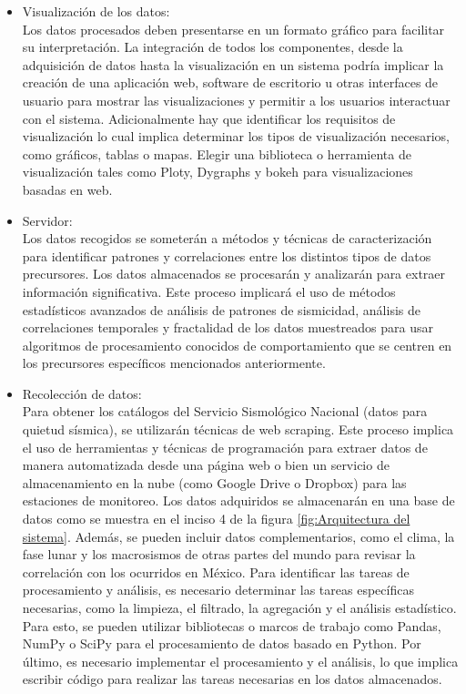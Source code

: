 \begin{itemize}
\item Visualización de los datos: \\
Los datos procesados deben presentarse en un formato gráfico para facilitar su interpretación. La integración de todos los componentes, desde la adquisición de datos hasta la visualización en un sistema podría implicar la creación de una aplicación web, software de escritorio u otras interfaces de usuario para mostrar las visualizaciones y permitir a los usuarios interactuar con el sistema. Adicionalmente hay que identificar los requisitos de visualización lo cual implica determinar los tipos de visualización necesarios, como gráficos, tablas o mapas. Elegir una biblioteca o herramienta de visualización tales como Ploty, Dygraphs y bokeh para visualizaciones basadas en web.
\\
\item Servidor:\\
Los datos recogidos se someterán a métodos y técnicas de caracterización para identificar patrones y correlaciones entre los distintos tipos de datos precursores.  Los datos almacenados se procesarán y analizarán para extraer información significativa. Este proceso implicará el uso de métodos estadísticos avanzados de análisis de patrones de sismicidad, análisis de correlaciones temporales y  fractalidad de los datos muestreados para usar algoritmos de procesamiento conocidos de comportamiento que se centren en los precursores específicos mencionados anteriormente. 
\\
\item Recolección de datos: \\
Para obtener los catálogos del Servicio Sismológico Nacional (datos para quietud sísmica), se utilizarán técnicas de web scraping. Este proceso implica el uso de herramientas y técnicas de programación para extraer datos de manera automatizada desde una página web \cite{SSN} o bien un servicio de almacenamiento en la nube (como Google Drive o Dropbox) para las estaciones de monitoreo. Los datos adquiridos se almacenarán en una base de datos como se muestra en el inciso 4 de la figura \ref{fig:Arquitectura del sistema}. Además, se pueden incluir datos complementarios, como el clima, la fase lunar y los macrosismos de otras partes del mundo para revisar la correlación con los ocurridos en México. Para identificar las tareas de procesamiento y análisis, es necesario determinar las tareas específicas necesarias, como la limpieza, el filtrado, la agregación y el análisis estadístico. Para esto, se pueden utilizar bibliotecas o marcos de trabajo como Pandas, NumPy o SciPy para el procesamiento de datos basado en Python. Por último, es necesario implementar el procesamiento y el análisis, lo que implica escribir código para realizar las tareas necesarias en los datos almacenados.

\end{itemize}
